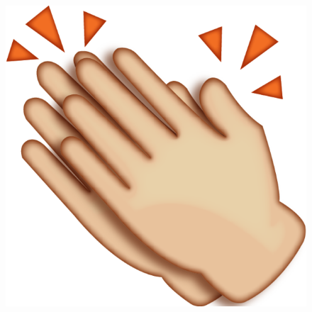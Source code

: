 \documentclass{beamer}
\begin{document}
\begin{frame}
	\begin{figure}[H]
		\center
		\includegraphics[trim = 0mm 0cm 0mm 0cm, clip,scale=0.39]{imagenes/Introduction/aplauso}
	\end{figure}
\end{frame}
\end{document}
